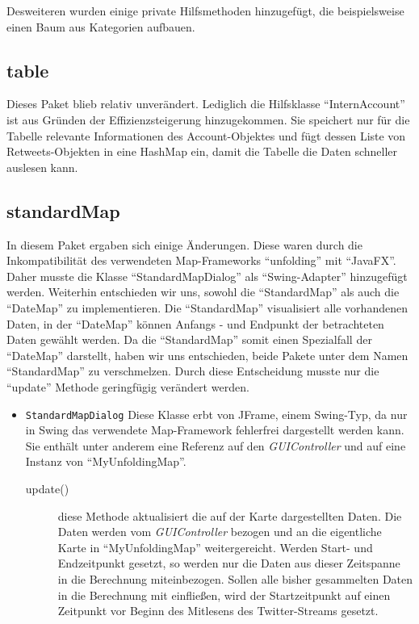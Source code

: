 Desweiteren wurden einige private Hilfsmethoden hinzugefügt, die beispielsweise einen Baum aus Kategorien aufbauen.

\subsection{table}
Dieses Paket blieb relativ unverändert. Lediglich die Hilfsklasse "`InternAccount"' ist aus Gründen der Effizienzsteigerung hinzugekommen.
Sie speichert nur für die Tabelle relevante Informationen des Account-Objektes und fügt dessen Liste von Retweets-Objekten in eine HashMap ein, damit die Tabelle die Daten schneller auslesen kann.
		
\subsection{standardMap}
In diesem Paket ergaben sich einige Änderungen. Diese waren durch die Inkompatibilität des verwendeten Map-Frameworks "`unfolding"' mit "`JavaFX"'. Daher musste die Klasse "`StandardMapDialog"' als "`Swing-Adapter"' hinzugefügt werden. Weiterhin entschieden wir uns, sowohl  die "`StandardMap"' als auch die "`DateMap"' zu implementieren. Die "`StandardMap"' visualisiert alle vorhandenen Daten, in der "`DateMap"' können Anfangs - und Endpunkt der betrachteten Daten gewählt werden. Da die "`StandardMap"' somit einen Spezialfall der "`DateMap"' darstellt, haben wir uns entschieden, beide Pakete unter dem Namen "`StandardMap"' zu verschmelzen. Durch diese Entscheidung musste nur die "`update"' Methode geringfügig verändert werden.
\begin{itemize}
	\item \lstinline{StandardMapDialog}
	\quad
	Diese Klasse erbt von JFrame, einem  Swing-Typ, da nur in Swing das verwendete Map-Framework fehlerfrei dargestellt werden kann. Sie enthält unter anderem eine Referenz auf den \emph{GUIController} und auf eine Instanz von "`MyUnfoldingMap"'.
	\begin{description}
		\item[update()] diese Methode aktualisiert die auf der Karte dargestellten Daten. Die Daten werden vom \emph{GUIController} bezogen und an die eigentliche Karte in "`MyUnfoldingMap"' weitergereicht. Werden Start- und Endzeitpunkt gesetzt, so werden nur die Daten aus dieser Zeitspanne in die Berechnung miteinbezogen. Sollen alle bisher gesammelten Daten in die Berechnung mit einfließen, wird der Startzeitpunkt auf einen Zeitpunkt vor Beginn des Mitlesens des Twitter-Streams gesetzt.
	\end{description}
\end{itemize}
		
